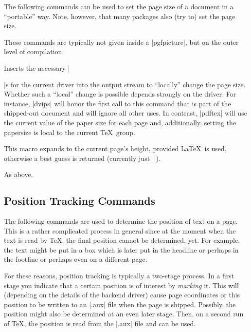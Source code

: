 The following commands can be used to set the page size of a document
in a ``portable'' way. Note, however, that many packages also (try to)
set the page size.

These commands are typically not given inside a |{pgfpicture}|, but on
the outer level of compilation.

\begin{command}{\pgfsys@papersize{}}
  Inserts the necessary |\special|s for the current driver into the
  output stream to ``locally'' change the page size. Whether such a
  ``local'' change is possible depends strongly on the driver. For
  instance, |dvips| will honor the first call to this command that is
  part of the shipped-out document and will ignore all other uses. In
  contrast, |pdftex| will use the current value of the paper size for
  each page and, additionally, setting the papersize is local to the
  current \TeX\ group.
\end{command}


\begin{command}{\pgfsys@thepageheight}
  This macro expands to the current page's height, provided \LaTeX\ is
  used, otherwise a best guess is returned (currently just |\the\vsize|). 
\end{command}

\begin{command}{\pgfsys@thepagewidth}
  As above.
\end{command}

\subsection{Position Tracking Commands}

The following commands are used to determine the position of text on a
page. This is a rather complicated process in general since at the
moment when the text is read by \TeX, the final position cannot be
determined, yet. For example, the text might be put in a box which is
later put in the headline or perhaps in the footline or perhaps even
on a different page.

For these reasons, position tracking is typically a two-stage
process. In a first stage you indicate that a certain position is of
interest by \emph{marking} it. This will (depending on the details of
the backend driver) cause page coordinates or this position to be
written to an |.aux| file when the page is shipped. Possibly, the
position might also be determined at an even later stage. Then, on a
second run of \TeX, the position is read from the |.aux| file and can
be used.

